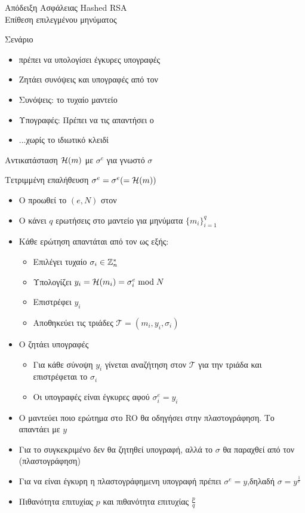 \documentclass[handout]{beamer}
\begin{document}
\begin{frame}[allowframebreaks]{Απόδειξη Ασφάλειας Hashed RSA \\ Επίθεση επιλεγμένου μηνύματος} 

\begin{block}{Σενάριο}
\begin{itemize}
\item \adv πρέπει να υπολογίσει έγκυρες υπογραφές
\item Ζητάει συνόψεις και υπογραφές από τον \advb
\item Συνόψεις: το τυχαίο μαντείο
\item Υπογραφές: Πρέπει να τις απαντήσει ο \advb
\item ...χωρίς το ιδιωτικό κλειδί
\end{itemize}
\end{block}


Αντικατάσταση $\mathcal{H} (m)$ με $\sigma^e$ για γνωστό $\sigma$

Τετριμμένη επαλήθευση $\sigma^e = \sigma^e (=\mathcal{H}(m))$



\framebreak
\begin{itemize}
\item Ο \advb προωθεί το $(e,N)$ στον \adv
\item O \adv κάνει $q$ ερωτήσεις στο μαντείο για μηνύματα $\{m_i\}_{i=1}^q$
\item Κάθε ερώτηση απαντάται από τον \advb ως εξής:
\begin{itemize}
\item Επιλέγει τυχαίο $\sigma_i \in \mathbb{Z}^*_n$
\item Υπολογίζει $y_i = \mathcal{H}(m_i) = \sigma_i^e \bmod N$
\item Επιστρέφει $y_i$
\item Aποθηκεύει τις  τριάδες $\mathcal{T} = (m_i, y_i, \sigma_i)$
\end{itemize}

\item O \adv ζητάει υπογραφές
\begin{itemize}
\item Για κάθε σύνοψη $y_i$ γίνεται αναζήτηση στον $\mathcal{T}$ για την τριάδα και επιστρέφεται το $\sigma_i$
\item Οι υπογραφές είναι έγκυρες αφού $\sigma_i^e = y_i$
\end{itemize}
\item Ο \advb μαντεύει ποιο ερώτημα στο RO θα οδηγήσει στην πλαστογράφηση.  Το απαντάει με $y$
\item Για το συγκεκριμένο δεν θα ζητηθεί υπογραφή, αλλά το $\sigma$ θα παραχθεί από τον \adv (πλαστογράφηση)
\item Για να είναι έγκυρη η πλαστογράφημενη υπογραφή πρέπει $\sigma^e = y$,δηλαδή $\sigma=y^\frac{1}{e}$
\item Πιθανότητα επιτυχίας \adv $p$ και πιθανότητα επιτυχίας \advb $\frac{p}{q}$
\end{itemize}


\end{frame}
\end{document}
